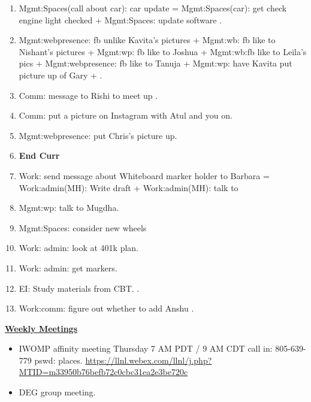 \begin{enumerate}
        \item \small Mgmt:Spaces(call about car): car update = Mgmt:Spaces(car): get check engine light checked +  Mgmt:Spaces: update software . 
 
        \item \small Mgmt:webpresence: fb unlike Kavita’s pictures + Mgmt:wb:
          fb like to Nishant's pictures +  Mgmt:wp: fb like to Joshua
          + Mgmt:wb:fb like to Leila's pics + Mgmt:webpresence: fb
          like to Tanuja + Mgmt:wp: have Kavita put picture up of Gary  + . 

        \item \small Comm: message to Rishi to meet up .
        \item \small Comm: put a picture on Instagram with Atul and you on. 
        \item \small Mgmt:webpresence: put Chris's picture up.
        
        \item \small \textbf{End Curr} 
        \item \small Work: send message about Whiteboard marker holder to
          Barbara = Work:admin(MH): Write draft +
          Work:admin(MH): talk to 

        \item \small Mgmt:wp: talk to Mugdha. 


        \item \small  Mgmt:Spaces: consider new wheels 
        \item \small Work: admin: look at 401k plan. 
        \item \small Work: admin: get markers.
         
        \item \small EI: Study materials from CBT.   .
        \item \small Work:comm: figure out whether to add Anshu .     
    \end{enumerate}

      
        
        \underline{\bf Weekly Meetings} 
        \begin{itemize}
          \tiny \item \tiny IWOMP affinity meeting Thursday 7 AM PDT / 9 AM
          CDT call in: 805-639-779 pswd: places. \url{https://llnl.webex.com/llnl/j.php?MTID=m33950b76befb72c0cbc31ea2e3be720c}
        \item \tiny DEG group meeting.  
        \end{itemize}

